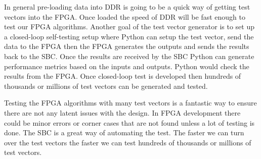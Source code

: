 In general pre-loading data into \ac{DDR} is going to be a quick way of getting test vectors into the \ac{FPGA}. Once loaded the speed of \ac{DDR} will be fast enough to test our \ac{FPGA} algorithms. Another goal of the test vector generator is to set up a closed-loop self-testing setup where Python can setup the test vector, send the data to the \ac{FPGA} then the \ac{FPGA} generates the outputs and sends the results back to the \ac{SBC}. Once the results are received by the \ac{SBC} Python can generate performance metrics based on the inputs and outputs. Python would check the results from the \ac{FPGA}. Once closed-loop test is developed then hundreds of thousands or millions of test vectors can be generated and tested.

Testing the \ac{FPGA} algorithms with many test vectors is a fantastic way to ensure there are not any latent issues with the design. In \ac{FPGA} development there could be minor errors or corner cases that are not found unless a lot of testing is done. The \ac{SBC} is a great way of automating the test. The faster we can turn over the test vectors the faster we can test hundreds of thousands or millions of test vectors. 

